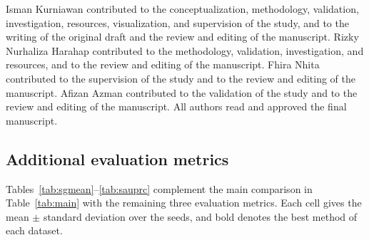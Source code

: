\documentclass[pdflatex,sn-basic]{sn-jnl}
\begin{document}
Isman Kurniawan contributed to the conceptualization, methodology,
validation, investigation, resources, visualization, and supervision of
the study, and to the writing of the original draft and the review and
editing of the manuscript. Rizky Nurhaliza Harahap contributed to the
methodology, validation, investigation, and resources, and to the
review and editing of the manuscript. Fhira Nhita contributed to the supervision of the study and to the review
and editing of the manuscript. Afizan Azman contributed to the
validation of the study and to the review and editing of the
manuscript. All authors read and approved the final manuscript.

\begin{appendices}

\section{Additional evaluation metrics}\label{secA1}

Tables~\ref{tab:sgmean}--\ref{tab:sauprc} complement the main comparison in
Table~\ref{tab:main} with the remaining three evaluation metrics. Each cell
gives the mean $\pm$ standard deviation over the seeds, and bold denotes
the best method of each dataset.


\end{appendices}
\end{document}
